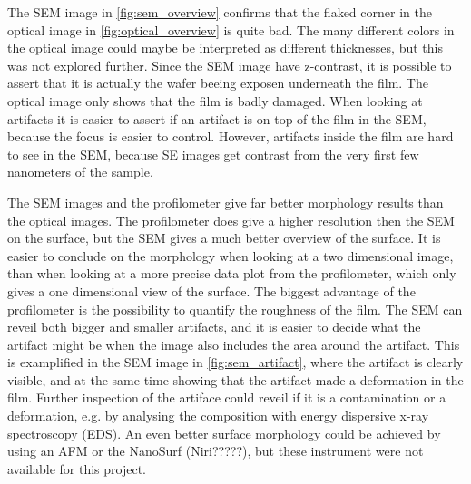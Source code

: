 The SEM image in \autoref{fig:sem_overview} confirms that the flaked corner in the optical image in \autoref{fig:optical_overview} is quite bad.
The many different colors in the optical image could maybe be interpreted as different thicknesses, but this was not explored further.
Since the SEM image have z-contrast, it is possible to assert that it is actually the wafer beeing exposen underneath the film.
The optical image only shows that the film is badly damaged.
When looking at artifacts it is easier to assert if an artifact is on top of the film in the SEM, because the focus is easier to control.
However, artifacts inside the film are hard to see in the SEM, because SE images get contrast from the very first few nanometers of the sample.

The SEM images and the profilometer give far better morphology results than the optical images.
The profilometer does give a higher resolution then the SEM on the surface, but the SEM gives a much better overview of the surface.
It is easier to conclude on the morphology when looking at a two dimensional image, than when looking at a more precise data plot from the profilometer, which only gives a one dimensional view of the surface.
The biggest advantage of the profilometer is the possibility to quantify the roughness of the film.
The SEM can reveil both bigger and smaller artifacts, and it is easier to decide what the artifact might be when the image also includes the area around the artifact.
This is examplified in the SEM image in \autoref{fig:sem_artifact}, where the artifact is clearly visible, and at the same time showing that the artifact made a deformation in the film.
Further inspection of the artiface could reveil if it is a contamination or a deformation, e.g. by analysing the composition with energy dispersive x-ray spectroscopy (EDS).
An even better surface morphology could be achieved by using an AFM or the NanoSurf (Niri?????), but these instrument were not available for this project.